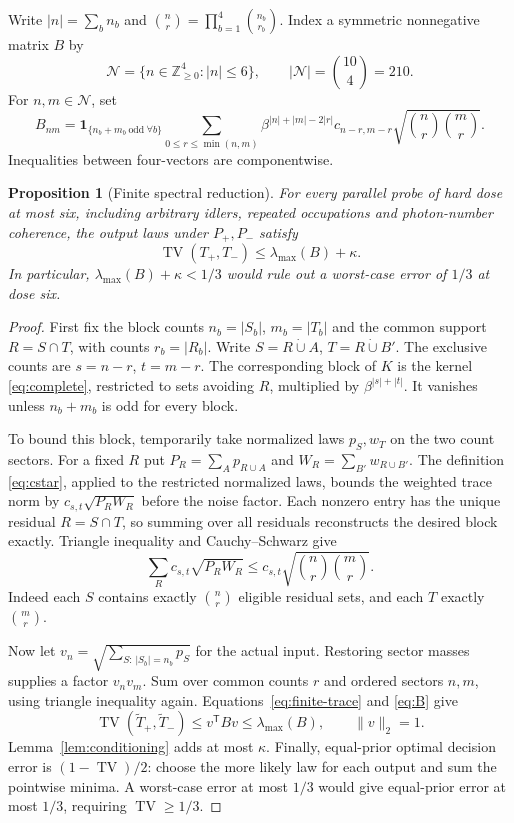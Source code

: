 \documentclass[11pt]{article}
\newtheorem{proposition}[theorem]{Proposition}
\newcommand{\TV}{\operatorname{TV}}
\newcommand{\1}{\mathbf 1}
\begin{document}
Write $|n|=\sum_bn_b$ and
$\binom nr=\prod_{b=1}^4\binom{n_b}{r_b}$. Index a symmetric
nonnegative matrix $B$ by
\[
             \mathcal N=\{n\in\mathbb Z_{\ge0}^4:|n|\le6\},
             \qquad |\mathcal N|=\binom{10}{4}=210.
\]
For $n,m\in\mathcal N$, set
\begin{equation}\label{eq:B}
 B_{nm}=\1_{\{n_b+m_b\ \mathrm{odd}\ \forall b\}}
 \sum_{0\le r\le\min(n,m)}
 \beta^{|n|+|m|-2|r|}c_{n-r,m-r}
                         \sqrt{\binom nr\binom mr}.
\end{equation}
Inequalities between four-vectors are componentwise.

\begin{proposition}[Finite spectral reduction]\label{prop:finite}
For every parallel probe of hard dose at most six, including arbitrary
idlers, repeated occupations and photon-number coherence, the output
laws under $P_+,P_-$ satisfy
\begin{equation}\label{eq:finite-goal}
                         \TV(T_+,T_-)\le\lambda_{\max}(B)+\kappa.
\end{equation}
In particular, $\lambda_{\max}(B)+\kappa<1/3$ would rule out a
worst-case error of $1/3$ at dose six.
\end{proposition}
\begin{proof}
First fix the block counts $n_b=|S_b|$, $m_b=|T_b|$ and the common
support $R=S\cap T$, with counts $r_b=|R_b|$.
Write $S=R\mathbin{\dot\cup}A$, $T=R\mathbin{\dot\cup}B'$.
The exclusive counts are $s=n-r$, $t=m-r$.
The corresponding block of $K$ is the kernel \eqref{eq:complete},
restricted to sets avoiding $R$, multiplied by $\beta^{|s|+|t|}$.
It vanishes unless $n_b+m_b$ is odd for every block.

To bound this block, temporarily take normalized laws $p_S,w_T$ on
the two count sectors. For a fixed $R$ put
$P_R=\sum_Ap_{R\cup A}$ and $W_R=\sum_{B'}w_{R\cup B'}$.
The definition \eqref{eq:cstar}, applied to the restricted normalized
laws, bounds the weighted trace norm by
$c_{s,t}\sqrt{P_RW_R}$ before the noise factor.
Each nonzero entry has the unique residual $R=S\cap T$, so summing
over all residuals reconstructs the desired block exactly.
Triangle inequality and Cauchy--Schwarz give
\[
 \sum_Rc_{s,t}\sqrt{P_RW_R}
 \le c_{s,t}\sqrt{\binom nr\binom mr}.
\]
Indeed each $S$ contains exactly $\binom nr$ eligible residual sets,
and each $T$ exactly $\binom mr$.

Now let $v_n=\sqrt{\sum_{S:\,|S_b|=n_b}p_S}$ for the actual input.
Restoring sector masses supplies a factor $v_nv_m$. Sum over common
counts $r$ and ordered sectors $n,m$, using triangle inequality again.
Equations~\eqref{eq:finite-trace} and \eqref{eq:B} give
\[
 \TV(\widetilde T_+,\widetilde T_-)
       \le v^{\mathsf T}Bv\le\lambda_{\max}(B),
       \qquad \|v\|_2=1.
\]
Lemma~\ref{lem:conditioning} adds at most $\kappa$.
Finally, equal-prior optimal decision error is $(1-\TV)/2$: choose
the more likely law for each output and sum the pointwise minima.
A worst-case error at most $1/3$ would give equal-prior error at most
$1/3$, requiring $\TV\ge1/3$.
\end{proof}
\end{document}
